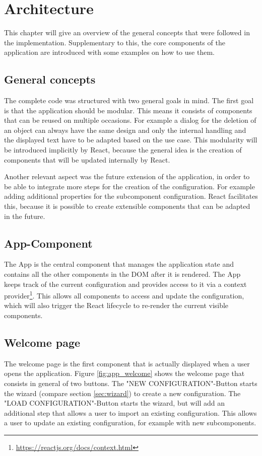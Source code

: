 \chapter{Architecture}
\label{sec:architecture}
This chapter will give an overview of the general concepts that were followed in the implementation. Supplementary to this, the core components of the application are introduced with some examples on how to use them.

\section{General concepts}
The complete code was structured with two general goals in mind. The first goal is that the application should be modular. This means it consists of components that can be reused on multiple occasions. For example a dialog for the deletion of an object can always have the same design and only the internal handling and the displayed text have to be adapted based on the use case. This modularity will be introduced implicitly by React, because the general idea is the creation of components that will be updated internally by React.

Another relevant aspect was the future extension of the application, in order to be able to integrate more steps for the creation of the configuration. For example adding additional properties for the subcomponent configuration. React facilitates this, because it is possible to create extensible components that can be adapted in the future.

\section{App-Component}
The App is the central component that manages the application state and contains all the other components in the DOM after it is rendered. The App keeps track of the current configuration and provides access to it via a context provider\footnote{\url{https://reactjs.org/docs/context.html}}. This allows all components to access and update the configuration, which will also trigger the React lifecycle to re-render the current visible components.

\section{Welcome page}
The welcome page is the first component that is actually displayed when a user opens the application. Figure \ref{fig:app_welcome} shows the welcome page that consists in general of two buttons. The "NEW CONFIGURATION"-Button starts the wizard (compare section \ref{sec:wizard}) to create a new configuration. The "LOAD CONFIGURATION"-Button starts the wizard, but will add an additional step that allows a user to import an existing configuration. This allows a user to update an existing configuration, for example with new subcomponents.


